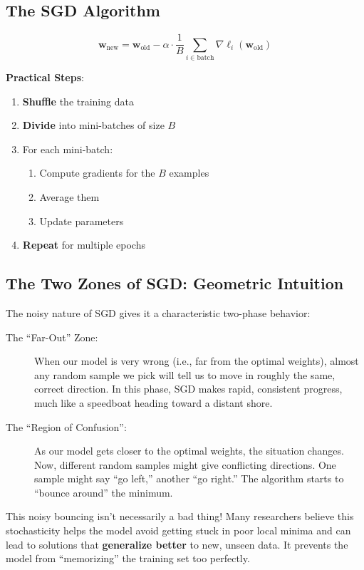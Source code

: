 \documentclass[11pt]{article}
\newcommand{\w}{\mathbf{w}}
\begin{document}
\subsection{The SGD Algorithm}
\begin{equation}
\boxed{\w_{\text{new}} = \w_{\text{old}} - \alpha \cdot \frac{1}{B} \sum_{i \in \text{batch}} \nabla \ell_i(\w_{\text{old}})}
\end{equation}

\textbf{Practical Steps}:
\begin{enumerate}
\item \textbf{Shuffle} the training data
\item \textbf{Divide} into mini-batches of size $B$
\item For each mini-batch:
   \begin{enumerate}
   \item Compute gradients for the $B$ examples
   \item Average them
   \item Update parameters
   \end{enumerate}
\item \textbf{Repeat} for multiple epochs
\end{enumerate}



\subsection{The Two Zones of SGD: Geometric Intuition}
The noisy nature of SGD gives it a characteristic two-phase behavior:
\begin{description}
    \item[The ``Far-Out'' Zone:] When our model is very wrong (i.e., far from the optimal weights), almost any random sample we pick will tell us to move in roughly the same, correct direction. In this phase, SGD makes rapid, consistent progress, much like a speedboat heading toward a distant shore.
    \item[The ``Region of Confusion'':] As our model gets closer to the optimal weights, the situation changes. Now, different random samples might give conflicting directions. One sample might say ``go left,'' another ``go right.'' The algorithm starts to ``bounce around'' the minimum.
\end{description}
This noisy bouncing isn't necessarily a bad thing! Many researchers believe this stochasticity helps the model avoid getting stuck in poor local minima and can lead to solutions that \textbf{generalize better} to new, unseen data. It prevents the model from ``memorizing'' the training set too perfectly.
\end{document}
